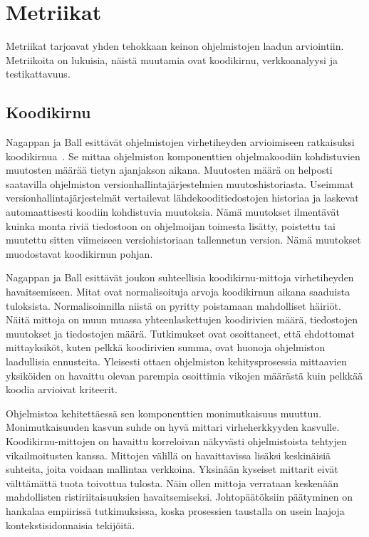 \documentclass[finnish]{../tktltiki2}
\theoremstyle{definition}
\theoremstyle{remark}
\begin{document}
\section{Metriikat}

Metriikat tarjoavat yhden tehokkaan keinon ohjelmistojen laadun arviointiin. Metriikoita on lukuisia, näistä muutamia 
ovat koodikirnu, verkkoanalyysi ja testikattavuus.

\subsection{Koodikirnu}

Nagappan ja Ball esittävät ohjelmistojen virhetiheyden arvioimiseen ratkaisuksi koodikirnua~\cite{NB05}. Se mittaa 
ohjelmiston komponenttien ohjelmakoodiin kohdistuvien muutosten määrää tietyn ajanjakson aikana. Muutosten määrä on 
helposti saatavilla ohjelmiston versionhallintajärjestelmien muutoshistoriasta. Useimmat versionhallintajärjestelmät 
vertailevat lähdekooditiedos\-tojen historiaa ja laskevat automaattisesti koodiin kohdistuvia muutoksia. Nämä muutokset 
ilmentävät kuinka monta riviä tiedostoon on ohjelmoijan toimesta lisätty, poistettu tai muutettu sitten viimeiseen 
versiohistoriaan tallennetun version. Nämä muutokset muodostavat koodikirnun pohjan.

    Nagappan ja Ball esittävät joukon suhteellisia koodikirnu-mittoja virhetiheyden havaitsemiseen. Mitat ovat 
normalisoituja arvoja koodikirnun aikana saaduista tuloksista. Normalisoinnilla niistä on pyritty poistamaan mahdolliset 
häiriöt. Näitä mittoja on muun muassa yhteenlaskettujen koodirivien määrä, tiedostojen muutokset ja tiedostojen määrä. 
Tutkimukset ovat osoittaneet, että ehdottomat mittayksiköt, kuten pelkkä koodirivien summa, ovat huonoja ohjelmiston 
laadullisia ennusteita. Yleisesti ottaen ohjelmiston kehitysprosessia mittaavien yksiköiden on havaittu olevan parempia
osoittimia vikojen määrästä kuin pelkkää koodia arvioivat kriteerit.

    Ohjelmistoa kehitettäessä sen komponenttien monimutkaisuus muuttuu. Monimutkaisuuden kasvun suhde on hyvä mittari 
virheherkkyyden kasvulle. Koodikirnu-mittojen on havaittu korreloivan näkyvästi ohjelmistoista tehtyjen vikailmoitusten 
kanssa. Mittojen välillä on havaittavissa lisäksi keskinäisiä suhteita, joita voidaan mallintaa verkkoina. Yksinään 
kyseiset mittarit eivät välttämättä tuota toivottua tulosta. Näin ollen mittoja verrataan keskenään mahdollisten 
ristiriitaisuuksien havaitsemiseksi. Johtopäätöksiin päätyminen on hankalaa empiirissä tutkimuksissa, koska prosessien 
taustalla on usein laajoja kontekstisidonnaisia tekijöitä.
\end{document}
